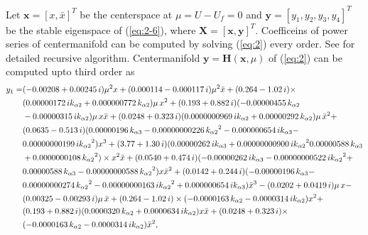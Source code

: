 \documentclass[openacc]{rsproca_new}%
\def\vec#1{\ensuremath{\mathbf{#1}}}
\newcommand{\Eref}[1]{(\ref{#1})}
\begin{document}
\begin{appendices}
\noindent Let $\vec{x}=[x,\bar x]^T$ be the centerspace at $\mu=U-U_f=0$ and $\vec y=[y_1,y_2,y_3,y_4]^T$ be the stable eigenspace of \Eref{eq:2-6}, where $\vec{X}=[\vec{x},\vec{y}]^T$. Coefficeins of power series of centermanifold can be computed by solving \Eref{eq:2} every order. See \cite{bi1999symbolic} for detailed recursive algorithm. Centermanifold $\vec y=\vec H(\vec x,\mu)$ of \Eref{eq:2} can be computed upto third order as
\begin{align}
\begin{split}
  y_1=&( - 0.00208+ 0.00245\,i ) { \mu}^{2}x+ (  0.000114-
  0.000117\,i ) { \mu}^{2}\bar {x}+ (  0.264- 1.02\,i ) \times\\
  &(  0.00000172\,i{  k_{\alpha 2}}+ 0.000000772\,{  k_{\alpha 2}} )  \mu\,{
  x}^{2}+ (  0.193+ 0.882\,i )  ( - 0.00000455\,{  k_{\alpha 2}
  }\\
  &- 0.00000315\,i{  k_{\alpha 2}} )  \mu\,x\bar {x}+(  0.0248+ 0.323\,i)
  (  0.0000000969\,i{  k_{\alpha 2}}+ 0.00000292\,{  k_{\alpha 2}}
  )  \mu\,{\bar {x}}^{2}+\\
& (  0.0635- 0.513\,i )  (
  0.00000196\,{  k_{\alpha 3}}- 0.00000000226\,{{  k_{\alpha 2}}}^{2}- 0.000000654\,i
  {  k_{\alpha 3}}-\\
& 0.00000000199\,i{{  k_{\alpha 2}}}^{2} ) {x}^{3}+   (
  3.77+ 1.30\,i )  (  0.00000262\,i{  k_{\alpha 3}}+ 0.00000000900
  \,i{{  k_{\alpha 2}}}^{2}\-0.00000588\,{  k_{\alpha 3}}\\&+ 0.0000000108\,{{  k_{\alpha 2}}}^{
  2} ) \times
  {x}^{2}\bar {x}+ (  0.0540+ 0.474\,i )  ( -
  0.00000262\,i{  k_{\alpha 3}}- 0.00000000522\,i{{  k_{\alpha 2}}}^{2}+ \\
  & 0.00000588\,
  {  k_{\alpha 3}}-0.00000000588\,{{  k_{\alpha 2}}}^{2} )x{\bar {x}}^{2}+(
  0.0142+ 0.244\,i )  ( - 0.00000196\,{  k_{\alpha 3}}-
  \\&0.00000000274\,{{  k_{\alpha 2}}}^{2}- 0.00000000163\,i{{  k_{\alpha 2}}}^{2}+
  0.000000654\,i{  k_{\alpha 3}} ) {\bar {x}}^{3}- (  0.0202+ 0.0419\,i
  )  \mu\,x-\\& (  0.00325- 0.00293\,i )  \mu\,\bar {x}+ (
  0.264- 1.02\,i ) \times  ( - 0.0000163\,{  k_{\alpha 2}}- 0.0000314\,i{
    k_{\alpha 2}} ) {x}^{2}+ \\&(  0.193+ 0.882\,i )  (
  0.0000320\,{  k_{\alpha 2}}+ 0.0000634\,i{  k_{\alpha 2}} ) x\bar {x}+(0.0248+ 0.323\,i )\times  \\&( - 0.0000163\,{  k_{\alpha 2}}- 0.0000314\,i
 {  k_{\alpha 2}} ) {\bar {x}}^{2},
\end{split}
\end{align}


\end{appendices}
\end{document}
